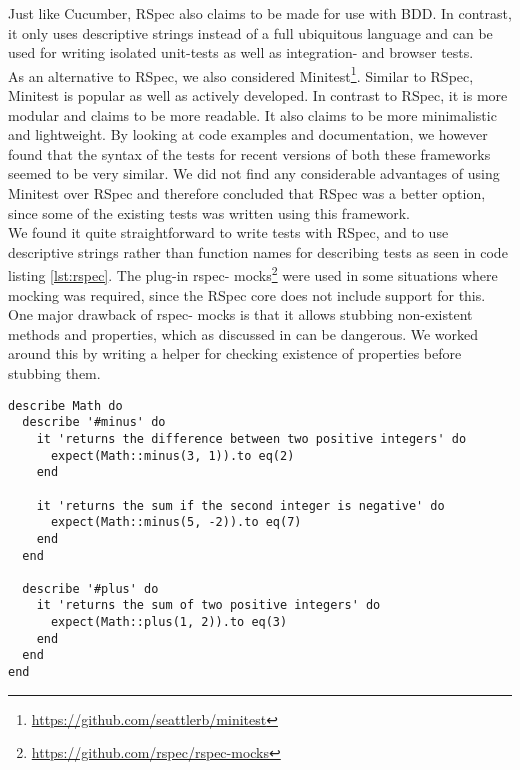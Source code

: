 
Just like Cucumber, RSpec also claims to be made for use with
BDD\cite{web:rspec}. In contrast, it only uses descriptive strings
instead of a full ubiquitous language and can be used for writing
isolated unit-tests as well as integration- and browser tests. \\

As an alternative to RSpec, we also considered
Minitest\footnote{\url{https://github.com/seattlerb/minitest}}. Similar
to RSpec, Minitest is popular as well as actively developed. In contrast
to RSpec, it is more modular and claims to be more readable. It also
claims to be more minimalistic and lightweight. By looking at code
examples and documentation, we however found that the syntax of the
tests for recent versions of both these frameworks seemed to be very
similar. We did not find any considerable advantages of using Minitest
over RSpec and therefore concluded that RSpec was a better option, since
some of the existing tests was written using this framework.\\

We found it quite straightforward to write tests with RSpec, and to use
descriptive strings rather than function names for describing tests as
seen in code listing \ref{lst:rspec}. The plug-in rspec-
mocks\footnote{\url{https://github.com/rspec/rspec-mocks}} were used in
some situations where mocking was required, since the RSpec core does
not include support for this. One major drawback of rspec- mocks is that
it allows stubbing non-existent methods and properties, which as
discussed in  can be dangerous. We worked around
this by writing a helper for checking existence of properties before
stubbing them.\\

\begin{lstlisting}[caption=Example of RSpec tests for a module.,
                   label=lst:rspec, float=t]
describe Math do
  describe '#minus' do
    it 'returns the difference between two positive integers' do
      expect(Math::minus(3, 1)).to eq(2)
    end

    it 'returns the sum if the second integer is negative' do
      expect(Math::minus(5, -2)).to eq(7)
    end
  end

  describe '#plus' do
    it 'returns the sum of two positive integers' do
      expect(Math::plus(1, 2)).to eq(3)
    end
  end
end
\end{lstlisting}
